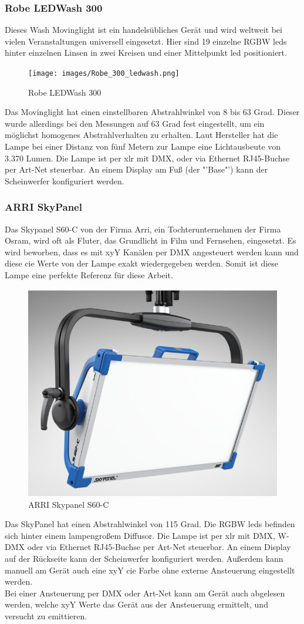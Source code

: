 \documentclass[11pt]{scrartcl}
\begin{document}
\subsubsection{Robe LEDWash 300}
Dieses Wash Movinglight ist ein handelsübliches Gerät und wird weltweit bei vielen Veranstaltungen universell eingesetzt. Hier sind 19 einzelne
RGBW \ac{led}s hinter einzelnen Linsen in zwei Kreisen und einer Mittelpunkt \ac{led} positioniert.
\begin{figure}[H]
    \begin{center}
        \texttt{[image: images/Robe\_300\_ledwash.png]}
    \end{center}
    \caption{Robe LEDWash 300 \cite{robe}}
\end{figure}
\noindent
Das Movinglight hat einen einstellbaren Abstrahlwinkel von 8 bis 63 Grad. Dieser wurde allerdings bei den Messungen auf 63 Grad fest eingestellt,
um ein möglichst homogenes Abstrahlverhalten zu erhalten. Laut Hersteller hat die Lampe bei einer Distanz von fünf Metern zur Lampe eine
Lichtausbeute von 3.370 Lumen. Die Lampe ist per \ac{xlr} mit DMX, oder via Ethernet RJ45-Buchse per Art-Net steuerbar. An einem Display
am Fuß (der "'Base"') kann der Scheinwerfer konfiguriert werden.
\subsubsection{ARRI SkyPanel}
Das Skypanel S60-C von der Firma Arri, ein Tochterunternehmen der Firma Osram, wird oft als Fluter, das Grundlicht in Film und Fernsehen, eingesetzt.
Es wird beworben, dass es mit xyY Kanälen per DMX angesteuert werden kann und diese \ac{cie} Werte von der Lampe exakt wiedergegeben werden. Somit
ist diese Lampe eine perfekte Referenz für diese Arbeit.
\begin{figure}[H]
    \begin{center}
        \includegraphics[width=.48\textwidth]{images/skypanel_s60_c.png}
    \end{center}
    \caption{ARRI Skypanel S60-C \cite{arri}}
\end{figure}
\noindent
Das SkyPanel hat einen Abstrahlwinkel von 115 Grad. Die RGBW \ac{led}s befinden sich hinter einem lampengroßem Diffusor. Die Lampe ist per
\ac{xlr} mit DMX, W-DMX oder via Ethernet RJ45-Buchse per Art-Net steuerbar. An einem Display auf der Rückseite kann der Scheinwerfer konfiguriert
werden. Außerdem kann manuell am Gerät auch eine xyY \ac{cie} Farbe ohne externe Ansteuerung eingestellt werden.\\
Bei einer Ansteuerung per DMX oder Art-Net kann am Gerät auch abgelesen werden, welche xyY Werte das Gerät aus der Ansteuerung ermittelt,
und versucht zu emittieren.
\end{document}

